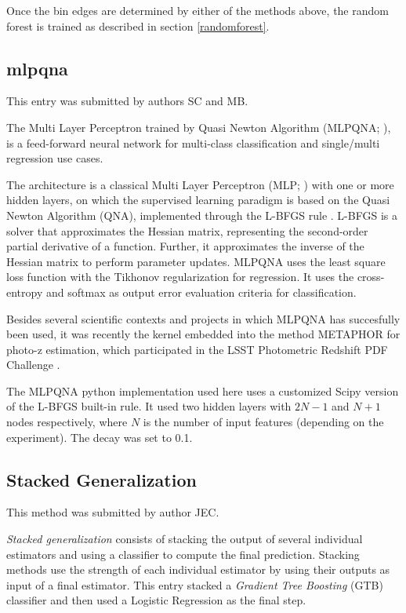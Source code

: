 \documentclass[twocolumn,twocolappendix]{aastex63}
\begin{document}
Once the bin edges are determined by either of the methods above, the random forest is trained as described in section \ref{randomforest}.



\subsection{ {\sc mlpqna} }
This entry was submitted by authors SC and MB.

The Multi Layer Perceptron trained by Quasi Newton Algorithm 
({\sc MLPQNA}; \citealp{Brescia12}), is a feed-forward neural network 
for multi-class classification and single/multi regression use cases.

The architecture is a classical Multi Layer Perceptron (MLP; \citealp{Rosenblatt1961})
with one or more hidden layers, on which the supervised learning paradigm is
based on the Quasi Newton Algorithm (QNA), implemented through the L-BFGS rule
\citep{Nocedal80}. L-BFGS is a solver that approximates the Hessian matrix,
representing the second-order partial derivative of a function. Further, it
approximates the inverse of the Hessian matrix to perform parameter updates.
MLPQNA uses the least square loss function with the Tikhonov regularization
\citep{Tikhonov77} for regression. It uses the cross-entropy \citep{deBoer05}
and softmax \citep{Sutton98} as output error evaluation criteria for
classification.

Besides several scientific contexts and projects in which MLPQNA has succesfully
been used, it was recently the kernel embedded into the method {\sc
METAPHOR} \citep{cavuoti20} for photo-z estimation, which participated in the
LSST Photometric Redshift PDF Challenge \citep{schmidt20}. 

The {\sc MLPQNA} python implementation used here
uses a customized Scipy version of the L-BFGS built-in rule.
It used two hidden layers with $2N-1$ and $N+1$ nodes respectively,
where $N$ is the number of input features (depending on the experiment).
The decay was set to 0.1.


\subsection{ {\sc Stacked Generalization} }
This method was submitted by author JEC.

\emph{Stacked generalization} consists of stacking the output of several individual estimators and 
using a classifier to compute the final prediction. Stacking methods use the strength of each 
individual estimator by using their outputs as input of a final estimator.  This entry stacked
a \emph{Gradient Tree Boosting} (GTB) classifier and then used a Logistic Regression as the final step.
\end{document}
